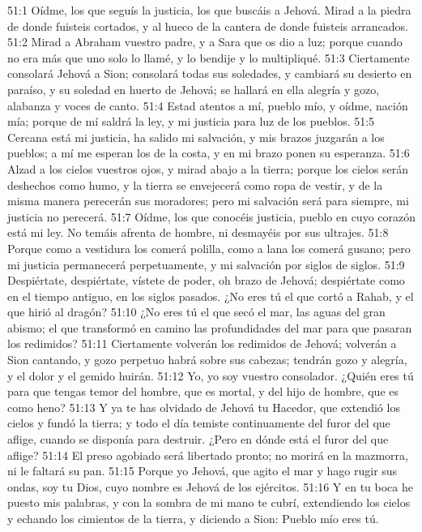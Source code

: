 51:1 Oídme, los que seguís la justicia, los que buscáis a Jehová. Mirad a la piedra de donde fuisteis cortados, y al hueco de la cantera de donde fuisteis arrancados. 
51:2 Mirad a Abraham vuestro padre, y a Sara que os dio a luz; porque cuando no era más que uno solo lo llamé, y lo bendije y lo multipliqué. 
51:3 Ciertamente consolará Jehová a Sion; consolará todas sus soledades, y cambiará su desierto en paraíso, y su soledad en huerto de Jehová; se hallará en ella alegría y gozo, alabanza y voces de canto. 
51:4 Estad atentos a mí, pueblo mío, y oídme, nación mía; porque de mí saldrá la ley, y mi justicia para luz de los pueblos. 
51:5 Cercana está mi justicia, ha salido mi salvación, y mis brazos juzgarán a los pueblos; a mí me esperan los de la costa, y en mi brazo ponen su esperanza. 
51:6 Alzad a los cielos vuestros ojos, y mirad abajo a la tierra; porque los cielos serán deshechos como humo, y la tierra se envejecerá como ropa de vestir, y de la misma manera perecerán sus moradores; pero mi salvación será para siempre, mi justicia no perecerá. 
51:7 Oídme, los que conocéis justicia, pueblo en cuyo corazón está mi ley. No temáis afrenta de hombre, ni desmayéis por sus ultrajes. 
51:8 Porque como a vestidura los comerá polilla, como a lana los comerá gusano; pero mi justicia permanecerá perpetuamente, y mi salvación por siglos de siglos. 
51:9 Despiértate, despiértate, vístete de poder, oh brazo de Jehová; despiértate como en el tiempo antiguo, en los siglos pasados. ¿No eres tú el que cortó a Rahab, y el que hirió al dragón? 
51:10 ¿No eres tú el que secó el mar, las aguas del gran abismo; el que transformó en camino las profundidades del mar para que pasaran los redimidos? 
51:11 Ciertamente volverán los redimidos de Jehová; volverán a Sion cantando, y gozo perpetuo habrá sobre sus cabezas; tendrán gozo y alegría, y el dolor y el gemido huirán. 
51:12 Yo, yo soy vuestro consolador. ¿Quién eres tú para que tengas temor del hombre, que es mortal, y del hijo de hombre, que es como heno? 
51:13 Y ya te has olvidado de Jehová tu Hacedor, que extendió los cielos y fundó la tierra; y todo el día temiste continuamente del furor del que aflige, cuando se disponía para destruir. ¿Pero en dónde está el furor del que aflige? 
51:14 El preso agobiado será libertado pronto; no morirá en la mazmorra, ni le faltará su pan. 
51:15 Porque yo Jehová, que agito el mar y hago rugir sus ondas, soy tu Dios, cuyo nombre es Jehová de los ejércitos. 
51:16 Y en tu boca he puesto mis palabras, y con la sombra de mi mano te cubrí, extendiendo los cielos y echando los cimientos de la tierra, y diciendo a Sion: Pueblo mío eres tú. 
